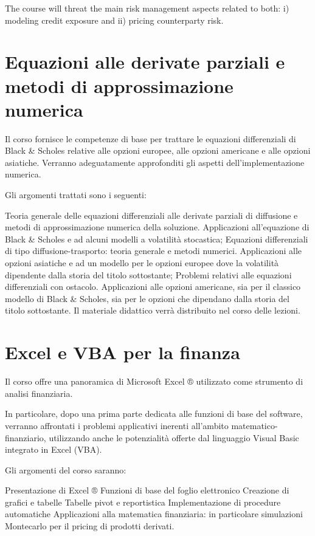 \documentclass[a4paper,10pt]{article}
\begin{document}
The course will threat the main risk management aspects related to both: i) modeling credit exposure and ii) pricing counterparty risk.

\section{Equazioni alle derivate parziali e metodi di approssimazione numerica}
Il corso fornisce le competenze di base per trattare le equazioni differenziali di Black \& Scholes relative alle opzioni europee, alle opzioni americane e alle opzioni asiatiche. Verranno adeguatamente approfonditi gli aspetti dell'implementazione numerica.

Gli argomenti trattati sono i seguenti:

Teoria generale delle equazioni differenziali alle derivate parziali di diffusione e metodi di approssimazione numerica della soluzione. Applicazioni all'equazione di Black \& Scholes e ad alcuni modelli a volatilità stocastica;
Equazioni differenziali di tipo diffusione-trasporto: teoria generale e metodi numerici. Applicazioni alle opzioni asiatiche e ad un modello per le opzioni europee dove la volatilità dipendente dalla storia del titolo sottostante;
Problemi relativi alle equazioni differenziali con ostacolo. Applicazioni alle opzioni americane, sia per il classico modello di Black \& Scholes, sia per le opzioni che dipendano dalla storia del titolo sottostante.
Il materiale didattico verrà distribuito nel corso delle lezioni.

\section{Excel e VBA per la finanza}
Il corso offre una panoramica di Microsoft Excel ® utilizzato come strumento di analisi finanziaria.

In particolare, dopo una prima parte dedicata alle funzioni di base del software, verranno affrontati i problemi applicativi inerenti all'ambito matematico-finanziario, utilizzando anche le potenzialità offerte dal linguaggio Visual Basic integrato in Excel (VBA).

Gli argomenti del corso saranno:

Presentazione di Excel ®
Funzioni di base del foglio elettronico
Creazione di grafici e tabelle
Tabelle pivot e reportistica
Implementazione di procedure automatiche
Applicazioni alla matematica finanziaria: in particolare simulazioni Montecarlo per il pricing di prodotti derivati.
\end{document}
